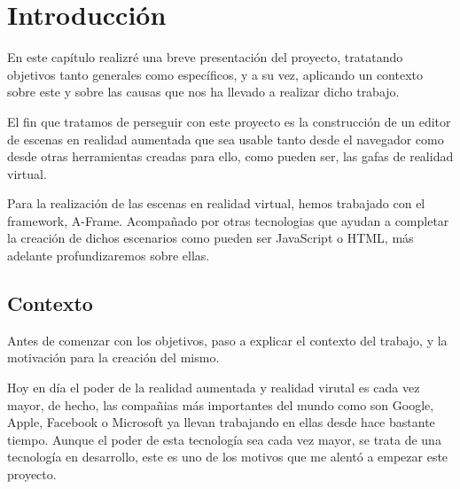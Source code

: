 \documentclass[a4paper, 12pt]{book}
\begin{document}
\tableofcontents 
\cleardoublepage
\listoffigures %



\cleardoublepage
\chapter{Introducción}
\label{sec:intro} %

En este capítulo realizré una breve presentación del proyecto, tratatando objetivos tanto generales como específicos, y a su vez, aplicando un contexto sobre este y sobre las causas que nos ha llevado a realizar dicho trabajo. 

El fin que tratamos de perseguir con este proyecto es la construcción de un editor de escenas en realidad aumentada que sea usable tanto desde el navegador como desde otras herramientas creadas para ello, como pueden ser, las gafas de realidad virtual.

Para la realización de las escenas en realidad virtual, hemos trabajado con el framework, A-Frame. Acompañado por otras tecnologias que ayudan a completar la creación de dichos escenarios como pueden ser JavaScript o HTML, más adelante profundizaremos sobre ellas.
\section{Contexto}
\label{sec:contexto}
Antes de comenzar con los objetivos, paso a explicar el contexto del trabajo, y la motivación para la creación del mismo.

Hoy en día el poder de la realidad aumentada y realidad virutal es cada vez mayor, de hecho, las compañias más importantes del mundo como son Google, Apple, Facebook o Microsoft ya llevan trabajando en ellas desde hace bastante tiempo. Aunque el poder de esta tecnología sea cada vez mayor, se trata de una tecnología en desarrollo, este es uno de los motivos que me alentó a empezar este proyecto.
\end{document}
